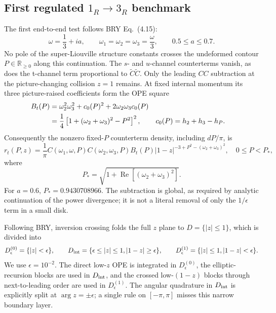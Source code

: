 \documentclass[11pt]{article}
\begin{document}
\subsection{First regulated $1_R\to3_R$ benchmark}

The first end-to-end test follows BRY Eq.~(4.15):
\begin{equation}
 \omega=\frac13+ia,\qquad
 \omega_1=\omega_2=\omega_3=\frac{\omega}{3},\qquad
 0.5\leq a\leq0.7.
 \label{eq:bry-complex-energy-benchmark}
\end{equation}
No pole of the super-Liouville structure constants crosses the undeformed
contour $P\in\mathbb R_{\geq0}$ along this continuation.  The $s$- and
$u$-channel counterterms vanish, as does the t-channel term proportional to
$\widetilde C\widetilde C$.  Only the leading $C C$ subtraction at the
picture-changing collision $z=1$ remains.  At fixed internal momentum its
three picture-raised coefficients form the OPE square
\begin{align}
 B_t(P)
 &=\omega_2^2\omega_3^2+c_0(P)^2
   +2\omega_2\omega_3c_0(P)
 \notag\\
 &=\frac14\left[1+(\omega_2+\omega_3)^2-P^2\right]^2,
 &
 c_0(P)&=h_2+h_3-h_P.
 \label{eq:bry-leading-t-counterterm-coefficient}
\end{align}
Consequently the nonzero fixed-$P$ counterterm density, including $dP/\pi$,
is
\begin{equation}
 r_t(P,z)=\frac{1}{\pi}
 C(\omega_1,\omega,P)C(\omega_2,\omega_3,P)B_t(P)
 |1-z|^{-3+P^2-(\omega_2+\omega_3)^2},
 \quad 0\leq P<P_* ,
 \label{eq:bry-leading-t-counterterm-density}
\end{equation}
where
\begin{equation}
 P_*=\sqrt{1+\operatorname{Re}\!\left[(\omega_2+\omega_3)^2\right]}.
 \label{eq:bry-t-counterterm-threshold}
\end{equation}
For $a=0.6$, $P_*=0.9430708966$.  The subtraction is global, as required by
analytic continuation of the power divergence; it is not a literal removal
of only the $1/\epsilon$ term in a small disk.

Following BRY, inversion crossing folds the full $z$ plane to
$D=\{|z|\leq1\}$, which is divided into
\begin{equation}
 D_\epsilon^{(0)}=\{|z|<\epsilon\},\qquad
 D_{\rm int}=\{\epsilon\leq|z|\leq1, |1-z|\geq\epsilon\},\qquad
 D_\epsilon^{(1)}=\{|z|\leq1, |1-z|<\epsilon\}.
 \label{eq:bry-three-moduli-regions}
\end{equation}
We use $\epsilon=10^{-2}$.  The direct low-$z$ OPE is integrated in
$D_\epsilon^{(0)}$, the elliptic-recursion blocks are used in $D_{\rm int}$,
and the crossed low-$(1-z)$ blocks through next-to-leading order are used in
$D_\epsilon^{(1)}$.  The angular quadrature in $D_{\rm int}$ is explicitly
split at $\arg z=\pm\epsilon$; a single rule on $[-\pi,\pi]$ misses this
narrow boundary layer.
\end{document}
